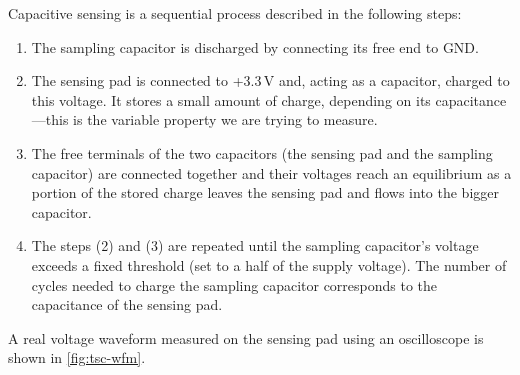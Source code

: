 \noindent
Capacitive sensing is a sequential process described in the following steps:

\begin{enumerate}
	\item The sampling capacitor is discharged by connecting its free end to \gls{GND}.
	\item The sensing pad is connected to +3.3\,V and, acting as a capacitor, charged to this voltage. It stores a small amount of charge, depending on its capacitance---this is the variable property we are trying to measure.
	\item The free terminals of the two capacitors (the sensing pad and the sampling capacitor) are connected together and their voltages reach an equilibrium as a portion of the stored charge leaves the sensing pad and flows into the bigger capacitor.
	\item The steps (2) and (3) are repeated until the sampling capacitor's voltage exceeds a fixed threshold (set to a half of the supply voltage). The number of cycles needed to charge the sampling capacitor corresponds to the capacitance of the sensing pad.
\end{enumerate}

\noindent
A real voltage waveform measured on the sensing pad using an oscilloscope is shown in \cref{fig:tsc-wfm}.


